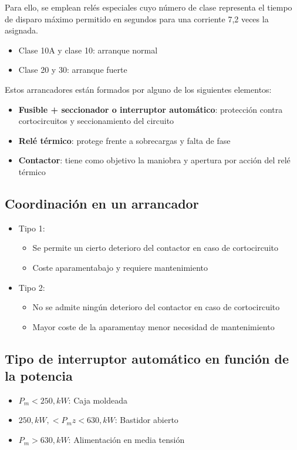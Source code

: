 Para ello, se emplean relés especiales cuyo número de clase representa el tiempo de disparo máximo permitido en segundos para una corriente 7,2 veces la asignada.
\begin{itemize}
	\item Clase 10A y clase 10: arranque normal
	\item Clase 20 y 30: arranque fuerte
\end{itemize}

Estos arrancadores están formados por alguno de los siguientes elementos:
\begin{itemize}
	\item \textbf{Fusible + seccionador o interruptor automático}: protección contra cortocircuitos y seccionamiento del circuito
	\item \textbf{Relé térmico}: protege frente a sobrecargas y falta de fase
	\item \textbf{Contactor}: tiene como objetivo la maniobra y apertura por acción del relé térmico
\end{itemize}
\subsection{Coordinación en un arrancador}
\begin{itemize}
	\item Tipo 1:
	\begin{itemize}
		\item Se permite un cierto deterioro del contactor en caso de cortocircuito
		\item
		Coste aparamentabajo y requiere mantenimiento
	\end{itemize}
	\item Tipo 2:
	\begin{itemize}
		\item No se admite ningún deterioro del contactor en caso de cortocircuito
		\item
		Mayor coste de la aparamentay menor necesidad de mantenimiento
	\end{itemize}
\end{itemize}
\subsection{Tipo de interruptor automático en función de la potencia}
\begin{itemize}
	\item $P_m<250,kW$: Caja moldeada
	\item $250,kW,<P_mz<630,kW$: Bastidor abierto
	\item $P_m>630,kW$: Alimentación en media tensión
\end{itemize}
